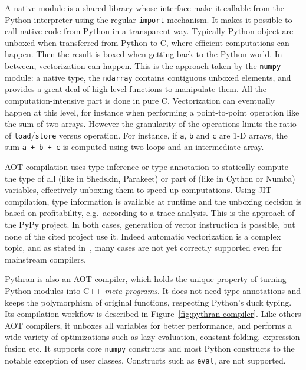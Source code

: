 \documentclass[preprint]{sigplanconf}
\begin{document}
A native module is a shared library whose interface make it callable from the
Python interpreter using the regular \texttt{import} mechanism. It makes it
possible to call native code from Python in a transparent way. Typically
Python object are unboxed when transferred from Python to C, where efficient
computations can happen. Then the result is boxed when getting back to the
Python world. In between, vectorization can happen. This is the approach taken
by the \texttt{numpy} module: a native type, the \texttt{ndarray} contains
contiguous unboxed elements, and provides a great deal of high-level functions
to manipulate them. All the computation-intensive part is done in pure C.
Vectorization can eventually happen at this level, for instance when performing
a point-to-point operation like the sum of two arrays. However the granularity
of the operations limits the ratio of \texttt{load}/\texttt{store} versus operation. For
instance, if \texttt{a}, \texttt{b} and \texttt{c} are 1-D arrays, the sum
\texttt{a + b + c} is computed using two loops and an intermediate array.

AOT compilation uses type inference or type annotation to statically compute
the type of all (like in Shedskin, Parakeet) or part of (like in Cython or
Numba) variables, effectively unboxing them to speed-up computations. Using JIT
compilation, type information is available at runtime and the unboxing decision
is based on profitability, e.g.\ according to a trace analysis. This is the
approach of the PyPy project. In both cases, generation of vector instruction
is possible, but none of the cited project use it. Indeed automatic
vectorization is a complex topic, and as stated in~\cite{maleki2011}, many cases
are not yet correctly supported even for mainstream compilers.

Pythran is also an AOT compiler, which holds the unique property of turning
Python modules into C++ \emph{meta-programs}. It does not need type annotations
and keeps the polymorphism of original functions, respecting Python's duck
typing. Its compilation workflow is described in Figure~\ref{fig:pythran-compiler}.
Like others AOT compilers, it unboxes all variables for better performance, and
performs a wide variety of optimizations such as lazy evaluation, constant
folding, expression fusion etc. It supports core \texttt{numpy} constructs and
most Python constructs to the notable exception of user classes. Constructs
such as \texttt{eval}, are not supported.
\end{document}
